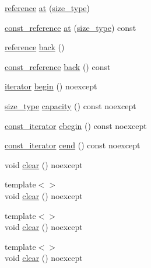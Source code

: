 \begin{DoxyCompactItemize}
\item 
\mbox{\hyperlink{classvector_a9b1a63f171d76a7a3995b6858e99f2ea}{reference}} \mbox{\hyperlink{classvector_a3b0051d5e19cb635377d23a3d33a9850}{at}} (\mbox{\hyperlink{classvector_ada51e68d31936547d3729c82daf6b7c6}{size\+\_\+type}})
\item 
\mbox{\hyperlink{classvector_af9ba3e25df088c62f7d535b91672cda9}{const\+\_\+reference}} \mbox{\hyperlink{classvector_a17ce3a171874bcf34bc18ddd087aee05}{at}} (\mbox{\hyperlink{classvector_ada51e68d31936547d3729c82daf6b7c6}{size\+\_\+type}}) const
\item 
\mbox{\hyperlink{classvector_a9b1a63f171d76a7a3995b6858e99f2ea}{reference}} \mbox{\hyperlink{classvector_aa41f79a418306ca7e1e2de5e017a369f}{back}} ()
\item 
\mbox{\hyperlink{classvector_af9ba3e25df088c62f7d535b91672cda9}{const\+\_\+reference}} \mbox{\hyperlink{classvector_a0325e7a80a5d2aa3978ff06218e3cb8f}{back}} () const
\item 
\mbox{\hyperlink{classvector_a35c955cacac6aacaa1e82874b1628865}{iterator}} \mbox{\hyperlink{classvector_a6cd8b8b30a3890ca28321f2fbbfa85e7}{begin}} () noexcept
\item 
\mbox{\hyperlink{classvector_ada51e68d31936547d3729c82daf6b7c6}{size\+\_\+type}} \mbox{\hyperlink{classvector_aa29fa7b1fc0d9fe1a57aee420ea25ed7}{capacity}} () const noexcept
\item 
\mbox{\hyperlink{classvector_a2fc97dce62b7053449cc868607540dba}{const\+\_\+iterator}} \mbox{\hyperlink{classvector_ad468480e12a1eb71fafa4a717930d558}{cbegin}} () const noexcept
\item 
\mbox{\hyperlink{classvector_a2fc97dce62b7053449cc868607540dba}{const\+\_\+iterator}} \mbox{\hyperlink{classvector_a4c2ff5d20e9d77b1936cafe08fdd10be}{cend}} () const noexcept
\item 
void \mbox{\hyperlink{classvector_a03bfacfaaba9195e4498375659f43531}{clear}} () noexcept
\item 
{\footnotesize template$<$$>$ }\\void \mbox{\hyperlink{classvector_a04eec80d86ebc36032d43bd8dbe9942a}{clear}} () noexcept
\item 
{\footnotesize template$<$$>$ }\\void \mbox{\hyperlink{classvector_a04eec80d86ebc36032d43bd8dbe9942a}{clear}} () noexcept
\item 
{\footnotesize template$<$$>$ }\\void \mbox{\hyperlink{classvector_a04eec80d86ebc36032d43bd8dbe9942a}{clear}} () noexcept

\end{DoxyCompactItemize}

